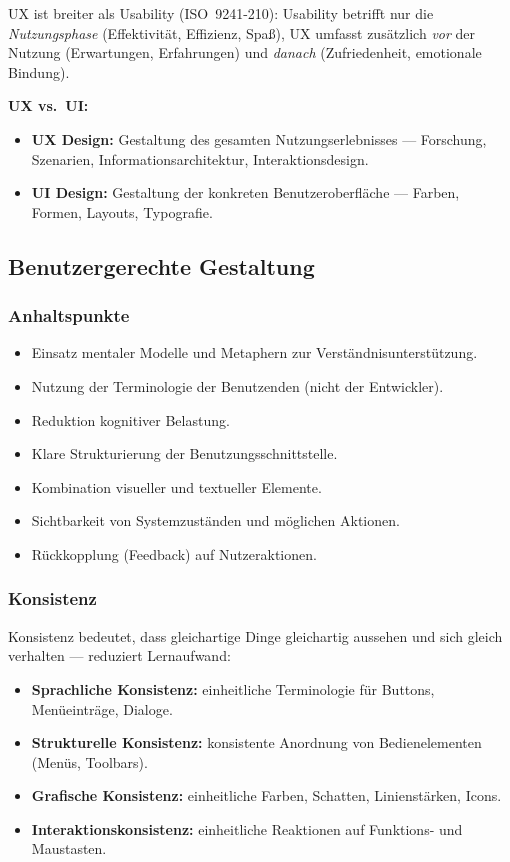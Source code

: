 \documentclass[12pt, a4paper]{article}
\begin{document}
UX ist breiter als Usability (ISO~9241-210): Usability betrifft nur die \textit{Nutzungsphase} (Effektivität, Effizienz, Spaß), UX umfasst zusätzlich \textit{vor} der Nutzung (Erwartungen, Erfahrungen) und \textit{danach} (Zufriedenheit, emotionale Bindung).

\textbf{UX vs.\ UI:}
\begin{itemize}
  \item \textbf{UX Design:} Gestaltung des gesamten Nutzungserlebnisses — Forschung, Szenarien, Informationsarchitektur, Interaktionsdesign.
  \item \textbf{UI Design:} Gestaltung der konkreten Benutzeroberfläche — Farben, Formen, Layouts, Typografie.
\end{itemize}

\subsection{Benutzergerechte Gestaltung}

\subsubsection*{Anhaltspunkte}
\begin{itemize}
  \item Einsatz mentaler Modelle und Metaphern zur Verständnisunterstützung.
  \item Nutzung der Terminologie der Benutzenden (nicht der Entwickler).
  \item Reduktion kognitiver Belastung.
  \item Klare Strukturierung der Benutzungsschnittstelle.
  \item Kombination visueller und textueller Elemente.
  \item Sichtbarkeit von Systemzuständen und möglichen Aktionen.
  \item Rückkopplung (Feedback) auf Nutzeraktionen.
\end{itemize}

\subsubsection*{Konsistenz}

Konsistenz bedeutet, dass gleichartige Dinge gleichartig aussehen und sich gleich verhalten — reduziert Lernaufwand:
\begin{itemize}
  \item \textbf{Sprachliche Konsistenz:} einheitliche Terminologie für Buttons, Menüeinträge, Dialoge.
  \item \textbf{Strukturelle Konsistenz:} konsistente Anordnung von Bedienelementen (Menüs, Toolbars).
  \item \textbf{Grafische Konsistenz:} einheitliche Farben, Schatten, Linienstärken, Icons.
  \item \textbf{Interaktionskonsistenz:} einheitliche Reaktionen auf Funktions- und Maustasten.
\end{itemize}
\end{document}

